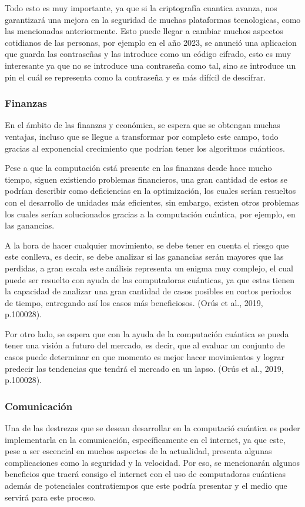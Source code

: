 \documentclass{article}
\begin{document}
Todo esto es muy importante, ya que si la criptografía cuantica avanza, nos garantizará una mejora en la seguridad de muchas plataformas tecnologicas, como las mencionadas anteriormente. Esto puede llegar a cambiar muchos aspectos cotidianos de las personas, por ejemplo en el año 2023, se anunció una aplicacion que guarda las contraseñas y las introduce como un código cifrado, esto es muy interesante ya que no se introduce una contraseña como tal, sino se introduce un pin el cuál se representa como la contraseña y es más difícil de descifrar.

 \subsubsection{Finanzas} 
 En el ámbito de las finanzas y económica, se espera que se obtengan muchas ventajas, incluso que se llegue a transformar por completo este campo, todo gracias al exponencial crecimiento que podrían tener los algoritmos cuánticos.
 
Pese a que la computación está presente en las finanzas desde hace mucho tiempo, siguen existiendo problemas financieros, una gran cantidad de estos se podrían describir como deficiencias en la optimización, los cuales serían resueltos con el desarrollo de unidades más eficientes, sin embargo, existen otros problemas los cuales serían solucionados gracias a la computación cuántica, por ejemplo, en las ganancias. 

A la hora de hacer cualquier movimiento, se debe tener en cuenta el riesgo que este conlleva, es decir, se debe analizar si las ganancias serán mayores que las perdidas, a gran escala este análisis representa un enigma muy complejo, el cual puede ser resuelto con ayuda de las computadoras cuánticas, ya que estas tienen la capacidad de analizar una gran cantidad de casos posibles en cortos periodos de tiempo, entregando así los casos más beneficiosos. (Orús et al., 2019, p.100028).

Por otro lado, se espera que con la ayuda de la computación cuántica se pueda tener una visión a futuro del mercado, es decir, que al evaluar un conjunto de casos puede determinar en que momento es mejor hacer movimientos y lograr predecir las tendencias que tendrá el mercado en un lapso. (Orús et al., 2019, p.100028).

\subsubsection{Comunicación}
Una de las destrezas que se desean desarrollar en la computació cuántica es poder implementarla en la comunicación, específicamente en el internet, ya que este, pese a ser escencial en muchos aspectos de la actualidad, presenta algunas complicaciones como la seguridad y la velocidad. Por eso, se mencionarán algunos beneficios que traerá consigo el internet con el uso de computadoras cuánticas además de potenciales contratiempos que este podría presentar y el medio que servirá para este proceso.
\end{document}
